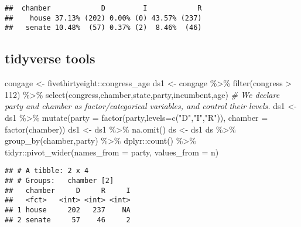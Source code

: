 \documentclass[
]{book}
\newenvironment{Shaded}{\begin{snugshade}}{\end{snugshade}}
\newcommand{\AttributeTok}[1]{\textcolor[rgb]{0.77,0.63,0.00}{#1}}
\newcommand{\CommentTok}[1]{\textcolor[rgb]{0.56,0.35,0.01}{\textit{#1}}}
\newcommand{\DecValTok}[1]{\textcolor[rgb]{0.00,0.00,0.81}{#1}}
\newcommand{\FunctionTok}[1]{\textcolor[rgb]{0.00,0.00,0.00}{#1}}
\newcommand{\NormalTok}[1]{#1}
\newcommand{\OtherTok}[1]{\textcolor[rgb]{0.56,0.35,0.01}{#1}}
\newcommand{\SpecialCharTok}[1]{\textcolor[rgb]{0.00,0.00,0.00}{#1}}
\newcommand{\StringTok}[1]{\textcolor[rgb]{0.31,0.60,0.02}{#1}}
\begin{document}
\begin{verbatim}
##  chamber            D         I            R
##    house 37.13% (202) 0.00% (0) 43.57% (237)
##   senate 10.48%  (57) 0.37% (2)  8.46%  (46)
\end{verbatim}

\hypertarget{tidyverse-tools}{%
\subsection{tidyverse tools}\label{tidyverse-tools}}

\begin{Shaded}
\begin{Highlighting}[]
\NormalTok{congage }\OtherTok{\textless{}{-}}\NormalTok{ fivethirtyeight}\SpecialCharTok{::}\NormalTok{congress\_age}
\NormalTok{ds1 }\OtherTok{\textless{}{-}}\NormalTok{ congage }\SpecialCharTok{\%\textgreater{}\%} \FunctionTok{filter}\NormalTok{(congress }\SpecialCharTok{\textgreater{}} \DecValTok{112}\NormalTok{) }\SpecialCharTok{\%\textgreater{}\%} \FunctionTok{select}\NormalTok{(congress,chamber,state,party,incumbent,age) }
\CommentTok{\#  We declare party and chamber as factor/categorical variables, and control their levels.}
\NormalTok{ds1 }\OtherTok{\textless{}{-}}\NormalTok{ ds1 }\SpecialCharTok{\%\textgreater{}\%} \FunctionTok{mutate}\NormalTok{(}\AttributeTok{party =} \FunctionTok{factor}\NormalTok{(party,}\AttributeTok{levels=}\FunctionTok{c}\NormalTok{(}\StringTok{"D"}\NormalTok{,}\StringTok{"I"}\NormalTok{,}\StringTok{"R"}\NormalTok{)),}
                    \AttributeTok{chamber =} \FunctionTok{factor}\NormalTok{(chamber))}
\NormalTok{ds1 }\OtherTok{\textless{}{-}}\NormalTok{ ds1 }\SpecialCharTok{\%\textgreater{}\%} \FunctionTok{na.omit}\NormalTok{()}
\NormalTok{ds }\OtherTok{\textless{}{-}}\NormalTok{ ds1  }
\NormalTok{ds }\SpecialCharTok{\%\textgreater{}\%} \FunctionTok{group\_by}\NormalTok{(chamber,party) }\SpecialCharTok{\%\textgreater{}\%} 
\NormalTok{  dplyr}\SpecialCharTok{::}\FunctionTok{count}\NormalTok{() }\SpecialCharTok{\%\textgreater{}\%} 
\NormalTok{  tidyr}\SpecialCharTok{::}\FunctionTok{pivot\_wider}\NormalTok{(}\AttributeTok{names\_from =}\NormalTok{ party, }\AttributeTok{values\_from =}\NormalTok{ n)}
\end{Highlighting}
\end{Shaded}

\begin{verbatim}
## # A tibble: 2 x 4
## # Groups:   chamber [2]
##   chamber     D     R     I
##   <fct>   <int> <int> <int>
## 1 house     202   237    NA
## 2 senate     57    46     2
\end{verbatim}
\end{document}
